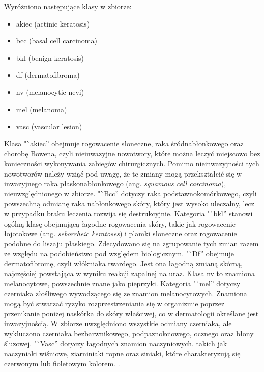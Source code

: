 Wyróżniono następujące klasy w zbiorze:
\begin{itemize}
	\item akiec (actinic keratosis)
	\item bcc (basal cell carcinoma)
	\item bkl (benign keratosis)
	\item df (dermatofibroma)
	\item nv (melanocytic nevi)
	\item mel (melanoma)
	\item vasc (vascular lesion)
\end{itemize}

Klasa "`akiec'' obejmuje rogowacenie słoneczne, raka śródnabłonkowego oraz chorobę Bowena, czyli nieinwazyjne nowotwory, które można leczyć miejscowo bez konieczności wykonywania zabiegów chirurgicznych.
Pomimo nieinwazyjności tych nowotworów należy wziąć pod uwagę, że te zmiany mogą przekształcić się w inwazyjnego raka płaskonabłonkowego (ang. \textit{squamous cell carcinoma}), nieuwzględnionego w zbiorze.
"`Bcc'' dotyczy raka podstawnokomórkowego, czyli powszechną odmianę raka nabłonkowego skóry, który jest wysoko uleczalny, lecz w przypadku braku leczenia rozwija się destrukcyjnie.
Kategoria "`bkl'' stanowi ogólną klasę obejmującą łagodne rogowacenia skóry, takie jak rogowacenie łojotokowe (ang. \textit{seborrheic keratoses}) i plamki słoneczne oraz rogowacenie podobne do liszaju płaskiego.
Zdecydowano się na zgrupowanie tych zmian razem ze względu na podobieństwo pod względem biologicznym.
"`Df'' obejmuje dermatofibromę, czyli włókniaka twardego.
Jest ona łagodną zmianą skórną, najczęściej powstająca w wyniku reakcji zapalnej na uraz.
Klasa nv to znamiona melanocytowe, powszechnie znane jako pieprzyki.
Kategoria "`mel'' dotyczy czerniaka złośliwego wywodzącego się ze znamion melanocytowych.
Znamiona mogą być stwarzać ryzyko rozprzestrzeniania się w organizmie poprzez przenikanie poniżej naskórka do skóry właściwej, co w dermatologii określane jest inwazyjnością.
W zbiorze uwzględniono wszystkie odmiany czerniaka, ale wykluczono czerniaka bezbarwnikowego, podpaznokciowego, ocznego oraz błony śluzowej.
"`Vasc'' dotyczy łagodnych znamion naczyniowych, takich jak naczyniaki wiśniowe, ziarniniaki ropne oraz siniaki, które charakteryzują się czerwonym lub fioletowym kolorem.
\cite{Kittler_2018}.

